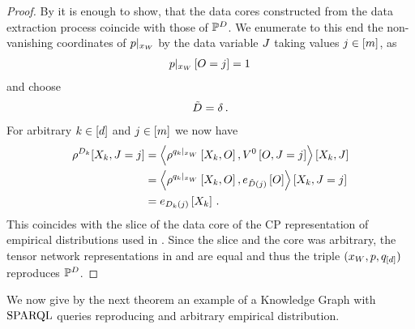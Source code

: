\begin{proof}
    By  it is enough to show, that the data cores constructed from the data extraction process coincide with those of $\mathbb{P}^{D}$.
    We enumerate to this end the non-vanishing coordinates of ${p}|_{x_{W}}$ by the data variable $J$ taking values $j\in[m]$, as
    \begin{align*}
        {p}|_{x_{W}} \left[O=j\right] = 1 \,
    \end{align*}
    and choose
    \begin{align*}
        \tilde{D} = \delta \, .
    \end{align*}
    For arbitrary $k\in[d]$ and $j\in[m]$ we now have
    \begin{align*}
        \rho^{D_{k}}[X_{k},J=j]
        &= \left\langle 
            \rho^{{q_{k}}|_{x_{W}}}\left[X_{k},O\right],
            V^{0}\left[O,J=j\right]
        \right\rangle \left[ X_{k},J \right] \\
        &= \left\langle 
            \rho^{{q_{k}}|_{x_{W}}}\left[X_{k},O\right],
            e_{\tilde{D}(j)}\left[O\right]
        \right\rangle \left[ X_{k},J=j \right] \\
        &= e_{D_k(j)}\left[X_{k}\right] \, .
    \end{align*}
    This coincides with the slice of the data core of the CP representation of empirical distributions used in .
    Since the slice and the core was arbitrary, the tensor network representations in  and  are equal and thus the triple $(x_{W},p,q_{[d]})$ reproduces $\mathbb{P}^{D}$.
\end{proof}


We now give by the next theorem an example of a Knowledge Graph with $\mathrm{SPARQL}$ queries reproducing and arbitrary empirical distribution.

